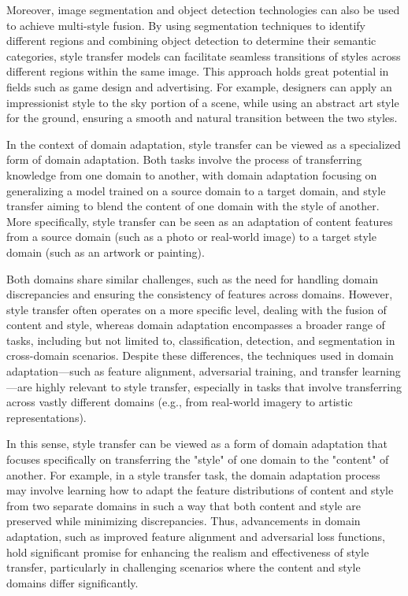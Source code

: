 \documentclass[preprint,12pt]{elsarticle}
\begin{document}
Moreover, image segmentation and object detection technologies can also be used to achieve multi-style fusion. By using segmentation techniques to identify different regions and combining object detection to determine their semantic categories, style transfer models can facilitate seamless transitions of styles across different regions within the same image. This approach holds great potential in fields such as game design and advertising. For example, designers can apply an impressionist style to the sky portion of a scene, while using an abstract art style for the ground, ensuring a smooth and natural transition between the two styles.

In the context of domain adaptation\citep{134farahani2021brief,135wang2018deep,136you2019universal,137ganin2015unsupervised}, style transfer can be viewed as a specialized form of domain adaptation. Both tasks involve the process of transferring knowledge from one domain to another, with domain adaptation focusing on generalizing a model trained on a source domain to a target domain, and style transfer aiming to blend the content of one domain with the style of another. More specifically, style transfer can be seen as an adaptation of content features from a source domain (such as a photo or real-world image) to a target style domain (such as an artwork or painting). 

Both domains share similar challenges, such as the need for handling domain discrepancies and ensuring the consistency of features across domains. However, style transfer often operates on a more specific level, dealing with the fusion of content and style, whereas domain adaptation encompasses a broader range of tasks, including but not limited to, classification, detection, and segmentation in cross-domain scenarios. Despite these differences, the techniques used in domain adaptation—such as feature alignment, adversarial training, and transfer learning—are highly relevant to style transfer, especially in tasks that involve transferring across vastly different domains (e.g., from real-world imagery to artistic representations).

In this sense, style transfer can be viewed as a form of domain adaptation that focuses specifically on transferring the "style" of one domain to the "content" of another. For example, in a style transfer task, the domain adaptation process may involve learning how to adapt the feature distributions of content and style from two separate domains in such a way that both content and style are preserved while minimizing discrepancies. Thus, advancements in domain adaptation, such as improved feature alignment and adversarial loss functions, hold significant promise for enhancing the realism and effectiveness of style transfer, particularly in challenging scenarios where the content and style domains differ significantly.
\end{document}
